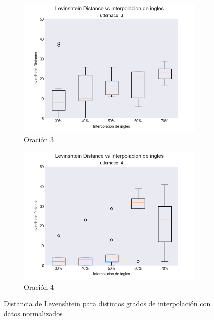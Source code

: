 \begin{figure}
\centering
\begin{subfigure}{.5\textwidth}
  \centering
	\includegraphics[trim={0 0 0 1.26cm},clip,width=1\textwidth]{imagenes/plots_normalized/3.png}
  \caption{Oración 3}
  \label{boxplot:fig3}
\end{subfigure}%
\begin{subfigure}{.5\textwidth}
  \centering
	\includegraphics[trim={0 0 0 1.26cm},clip,width=1\textwidth]{imagenes/plots_normalized/4.png}
  \caption{Oración 4}
  \label{boxplot:fig4}
\end{subfigure}
\caption{Distancia de Levenshtein para distintos grados de interpolación con datos normalizados}
\label{oracionCuatro}
\end{figure}

